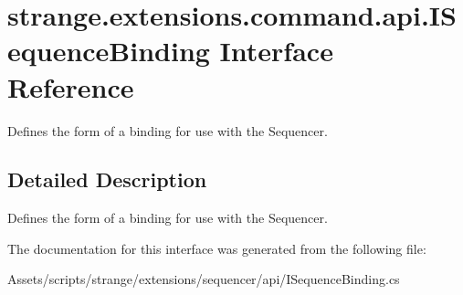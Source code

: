 \hypertarget{interfacestrange_1_1extensions_1_1command_1_1api_1_1_i_sequence_binding}{\section{strange.\-extensions.\-command.\-api.\-I\-Sequence\-Binding Interface Reference}
\label{interfacestrange_1_1extensions_1_1command_1_1api_1_1_i_sequence_binding}
}


Defines the form of a binding for use with the Sequencer.  




\subsection{Detailed Description}
Defines the form of a binding for use with the Sequencer. 

The documentation for this interface was generated from the following file\-:\begin{DoxyCompactItemize}
\item 
Assets/scripts/strange/extensions/sequencer/api/I\-Sequence\-Binding.\-cs\end{DoxyCompactItemize}

